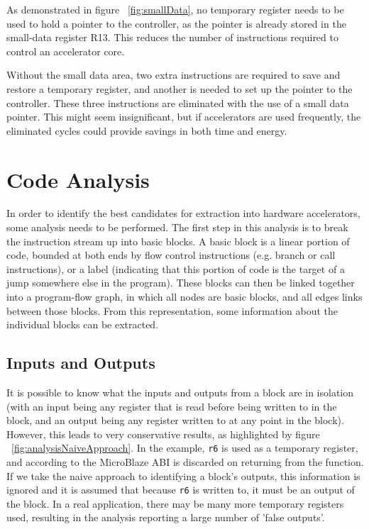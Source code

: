 \documentclass{UoYCSproject}
\begin{document}
As demonstrated in figure ~\ref{fig:smallData}, no temporary register needs to be used to hold a
pointer to the controller, as the pointer is already stored in the small-data register R13.
This reduces the number of instructions required to control an accelerator core.

Without the small data area, two extra instructions are required to save and restore a temporary register,
and another is needed to set up the pointer to the controller. These three instructions are eliminated with the use of a small
data pointer. This might seem insignificant, but if accelerators are used frequently, the eliminated cycles could provide
savings in both time and energy.

\section{Code Analysis}

In order to identify the best candidates for extraction into hardware accelerators, some analysis needs to be performed.
The first step in this analysis is to break the instruction stream up into basic blocks. A basic block is a linear portion of
code, bounded at both ends by flow control instructions (e.g. branch or call instructions), or a label (indicating that this
portion of code is the target of a jump somewhere else in the program). These blocks can then be linked
together into a program-flow graph, in which all nodes are basic blocks, and all edges links between those blocks.
From this representation, some information about the individual blocks can be extracted.

\subsection{Inputs and Outputs}

It is possible to know what the inputs and outputs from a block are in isolation (with an input being any register that is read
before being written to in the block, and an output being any register written to at any point in the block). However, this leads
to very conservative results, as highlighted by figure ~\ref{fig:analysisNaiveApproach}. In the example, \texttt{r6} is used as a
temporary register, and according to the MicroBlaze ABI \cite{microblaze-ref} is discarded on returning from the function. If we
take the naive approach to identifying a block's outputs, this information is ignored and it is assumed that because \texttt{r6}
is written to, it must be an output of the block. In a real application, there may be many more temporary registers used,
resulting in the analysis reporting a large number of 'false outputs'.
\end{document}
